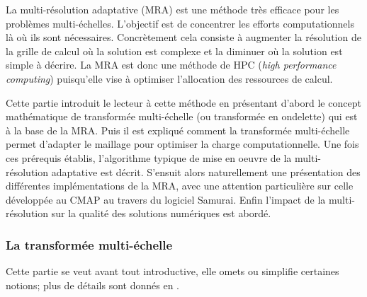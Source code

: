 
La multi-résolution adaptative (MRA) est une méthode très efficace pour les problèmes multi-échelles. 
L'objectif est de concentrer les efforts computationnels là où ils sont nécessaires. 
Concrètement cela consiste à augmenter la résolution de la grille de calcul où la solution est complexe et la diminuer où la solution est simple à décrire.
La MRA est donc une méthode de HPC (\textit{high performance computing}) puisqu'elle vise à optimiser l'allocation des ressources de calcul.\par
Cette partie introduit le lecteur à cette méthode en présentant d'abord le concept mathématique de transformée multi-échelle (ou transformée en ondelette)
qui est à la base de la MRA. 
Puis il est expliqué comment la transformée multi-échelle permet d'adapter le maillage pour optimiser la charge computationnelle.
Une fois ces prérequis établis, l'algorithme typique de mise en oeuvre de la multi-résolution adaptative est décrit.
S’ensuit alors naturellement une présentation des différentes implémentations de la MRA, avec une attention particulière sur celle développée au CMAP au travers 
du logiciel Samurai.
Enfin l'impact de la multi-résolution sur la qualité des solutions numériques est abordé. 

\subsubsection{La transformée multi-échelle}
    Cette partie se veut avant tout introductive, elle omets ou simplifie certaines notions; plus de détails sont donnés en \cite{postePoly}.

